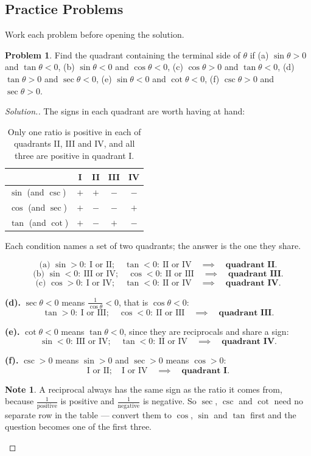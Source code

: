 \documentclass[11pt,a4paper]{article}
\theoremstyle{definition}
\newtheorem{note}[thm]{Note}
\newtheorem{problemx}{Problem}[section]
\newenvironment{problem}{\begin{problemx}}{\end{problemx}}
\newenvironment{solution}
  {\renewcommand{\qedsymbol}{}\begin{proof}[\textit{Solution}.]}
  {\end{proof}}
\begin{document}
\subsection{Practice Problems}

Work each problem before opening the solution.

\begin{problem}
Find the quadrant containing the terminal side of $\theta$ if
\quad (a) $\sin\theta>0$ and $\tan\theta<0$, \quad
(b) $\sin\theta<0$ and $\cos\theta<0$, \quad
(c) $\cos\theta>0$ and $\tan\theta<0$, \quad
(d) $\tan\theta>0$ and $\sec\theta<0$, \quad
(e) $\sin\theta<0$ and $\cot\theta<0$, \quad
(f) $\csc\theta>0$ and $\sec\theta>0$.
\end{problem}

\begin{solution}
The signs in each quadrant are worth having at hand:

\begin{table}[H]
\centering
\begin{tabular}{|l|c|c|c|c|}
\hline
 & I & II & III & IV\\
\hline
$\sin$ (and $\csc$) & $+$ & $+$ & $-$ & $-$\\
$\cos$ (and $\sec$) & $+$ & $-$ & $-$ & $+$\\
$\tan$ (and $\cot$) & $+$ & $-$ & $+$ & $-$\\
\hline
\end{tabular}
\caption{Only one ratio is positive in each of quadrants II, III and IV, and all three are positive in quadrant I.}
\end{table}

Each condition names a set of two quadrants; the answer is the one they share.

$$\text{(a) } \sin>0:\ \text{I or II};\quad \tan<0:\ \text{II or IV}
\quad\implies\quad \textbf{quadrant II}.$$
$$\text{(b) } \sin<0:\ \text{III or IV};\quad \cos<0:\ \text{II or III}
\quad\implies\quad \textbf{quadrant III}.$$
$$\text{(c) } \cos>0:\ \text{I or IV};\quad \tan<0:\ \text{II or IV}
\quad\implies\quad \textbf{quadrant IV}.$$

\textbf{(d).} $\sec\theta<0$ means $\frac{1}{\cos\theta}<0$, that is $\cos\theta<0$:
$$\tan>0:\ \text{I or III};\quad \cos<0:\ \text{II or III}
\quad\implies\quad \textbf{quadrant III}.$$

\textbf{(e).} $\cot\theta<0$ means $\tan\theta<0$, since they are reciprocals and share
a sign:
$$\sin<0:\ \text{III or IV};\quad \tan<0:\ \text{II or IV}
\quad\implies\quad \textbf{quadrant IV}.$$

\textbf{(f).} $\csc>0$ means $\sin>0$ and $\sec>0$ means $\cos>0$:
$$\text{I or II};\quad \text{I or IV}\quad\implies\quad \textbf{quadrant I}.$$

\begin{note}
A reciprocal always has the same sign as the ratio it comes from, because
$\frac{1}{\text{positive}}$ is positive and $\frac{1}{\text{negative}}$ is negative. So
$\sec$, $\csc$ and $\cot$ need no separate row in the table --- convert them to $\cos$,
$\sin$ and $\tan$ first and the question becomes one of the first three.
\end{note}
\end{solution}
\end{document}
